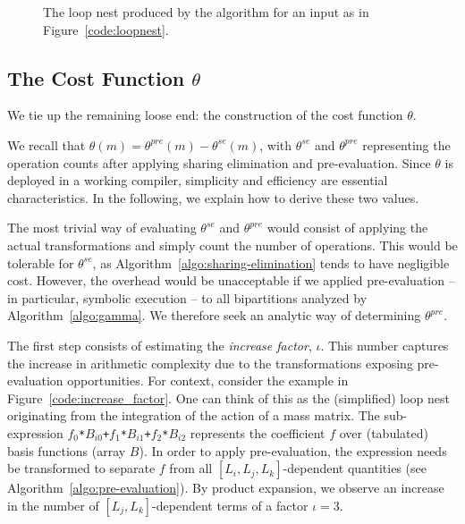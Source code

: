 \begin{figure}[h]\begin{CenteredBox}

\end{CenteredBox}\caption{The loop nest produced by the algorithm for an input as in Figure~\ref{code:loopnest}.}\label{code:loopnest-opt}\end{figure}


\subsection{The Cost Function $\theta$}
\label{sec:op_count}
We tie up the remaining loose end: the construction of the cost function $\theta$.

We recall that $\theta(m) = \theta^{pre}(m) - \theta^{se}(m)$, with $\theta^{se}$ and $\theta^{pre}$ representing the operation counts after applying sharing elimination and pre-evaluation. Since $\theta$ is deployed in a working compiler, simplicity and efficiency are essential characteristics. In the following, we explain how to derive these two values.

The most trivial way of evaluating $\theta^{se}$ and $\theta^{pre}$ would consist of applying the actual transformations and simply count the number of operations. This would be tolerable for $\theta^{se}$, as Algorithm~\ref{algo:sharing-elimination} tends to have negligible cost. However, the overhead would be unacceptable if we applied pre-evaluation -- in particular, symbolic execution -- to all bipartitions analyzed by Algorithm~\ref{algo:gamma}. We therefore seek an analytic way of determining $\theta^{pre}$.

The first step consists of estimating the \textit{increase factor}, $\iota$. This number captures the increase in arithmetic complexity due to the transformations exposing pre-evaluation opportunities. For context, consider the example in Figure~\ref{code:increase_factor}. One can think of this as the (simplified) loop nest originating from the integration of the action of a mass matrix. The sub-expression \texttt{$f_0$*$B_{i0}$+$f_1$*$B_{i1}$+$f_2$*$B_{i2}$} represents the coefficient $f$ over (tabulated) basis functions (array $B$). In order to apply pre-evaluation, the expression needs be transformed to separate $f$ from all $[L_i, L_j, L_k]$-dependent quantities (see Algorithm~\ref{algo:pre-evaluation}). By product expansion, we observe an increase in the number of $[L_j, L_k]$-dependent terms of a factor $\iota = 3$.

